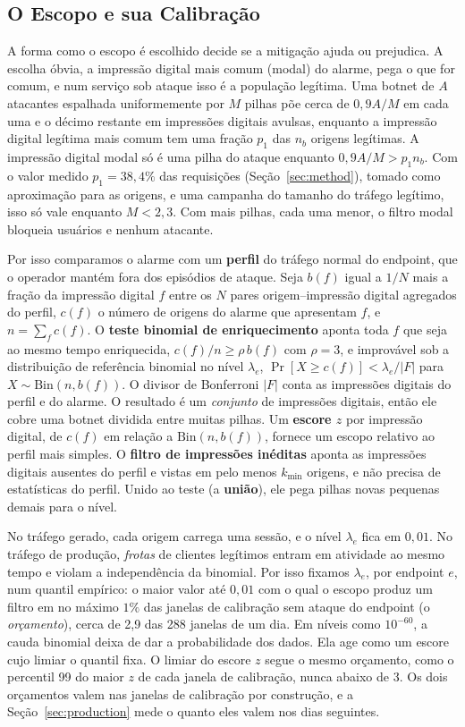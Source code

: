 \documentclass[conference,letterpaper,10pt]{IEEEtran}
\newcommand\1{\textit{(i)}}
\newcommand\2{\textit{(ii)}}
\newcommand\3{\textit{(iii)}}
\begin{document}
\subsection{O Escopo e sua Calibração}
\label{sec:evidence}

A forma como o escopo é escolhido decide se a mitigação ajuda ou prejudica. A escolha óbvia, a impressão digital mais comum (modal) do alarme, pega o que for comum, e num serviço sob ataque isso é a população legítima. Uma botnet de $A$ atacantes espalhada uniformemente por $M$ pilhas põe cerca de $0{,}9A/M$ em cada uma e o décimo restante em impressões digitais avulsas, enquanto a impressão digital legítima mais comum tem uma fração $p_1$ das $n_b$ origens legítimas. A impressão digital modal só é uma pilha do ataque enquanto $0{,}9A/M > p_1 n_b$. Com o valor medido $p_1 = 38{,}4\%$ das requisições (Seção~\ref{sec:method}), tomado como aproximação para as origens, e uma campanha do tamanho do tráfego legítimo, isso só vale enquanto $M < 2{,}3$. Com mais pilhas, cada uma menor, o filtro modal bloqueia usuários e nenhum atacante.

Por isso comparamos o alarme com um \textbf{perfil} do tráfego normal do endpoint, que o operador mantém fora dos episódios de ataque. Seja $b(f)$ igual a $1/N$ mais a fração da impressão digital $f$ entre os $N$ pares origem--impressão digital agregados do perfil, $c(f)$ o número de origens do alarme que apresentam $f$, e $n = \sum_f c(f)$. O \textbf{teste binomial de enriquecimento} aponta toda $f$ que seja ao mesmo tempo enriquecida, $c(f)/n \geq \rho\, b(f)$ com $\rho = 3$, e improvável sob a distribuição de referência binomial no nível $\lambda_e$, $\Pr[X \geq c(f)] < \lambda_e/|F|$ para $X \sim \mathrm{Bin}(n, b(f))$. O divisor de Bonferroni $|F|$ conta as impressões digitais do perfil e do alarme. O resultado é um \textit{conjunto} de impressões digitais, então ele cobre uma botnet dividida entre muitas pilhas. Um \textbf{escore $z$} por impressão digital, de $c(f)$ em relação a $\mathrm{Bin}(n, b(f))$, fornece um escopo relativo ao perfil mais simples. O \textbf{filtro de impressões inéditas} aponta as impressões digitais ausentes do perfil e vistas em pelo menos $k_{\min}$ origens, e não precisa de estatísticas do perfil. Unido ao teste (a \textbf{união}), ele pega pilhas novas pequenas demais para o nível.

No tráfego gerado, cada origem carrega uma sessão, e o nível $\lambda_e$ fica em $0{,}01$. No tráfego de produção, \textit{frotas} de clientes legítimos entram em atividade ao mesmo tempo e violam a independência da binomial. Por isso fixamos $\lambda_e$, por endpoint $e$, num quantil empírico: o maior valor até $0{,}01$ com o qual o escopo produz um filtro em no máximo $1\%$ das janelas de calibração sem ataque do endpoint (o \textit{orçamento}), cerca de 2,9 das 288 janelas de um dia. Em níveis como $10^{-60}$, a cauda binomial deixa de dar a probabilidade dos dados. Ela age como um escore cujo limiar o quantil fixa. O limiar do escore $z$ segue o mesmo orçamento, como o percentil 99 do maior $z$ de cada janela de calibração, nunca abaixo de 3. Os dois orçamentos valem nas janelas de calibração por construção, e a Seção~\ref{sec:production} mede o quanto eles valem nos dias seguintes.
\end{document}
